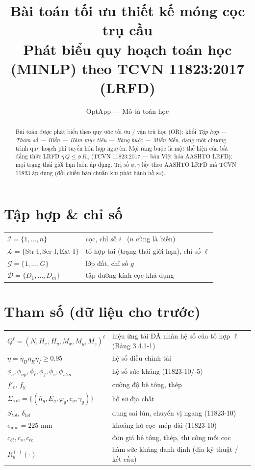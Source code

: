 \documentclass[11pt,a4paper]{article}
\title{\textbf{Bài toán tối ưu thiết kế móng cọc trụ cầu}\\[3pt]
\large Phát biểu quy hoạch toán học (MINLP) theo TCVN 11823:2017 (LRFD)}
\author{OptApp --- Mô tả toán học}
\date{}
\newcommand{\Dset}{\mathcal{D}}
\newcommand{\Lset}{\mathcal{L}}
\newcommand{\Iset}{\mathcal{I}}
\begin{document}
\maketitle

\begin{abstract}\noindent
Bài toán được phát biểu theo quy ước tối ưu / vận trù học (OR): khối \emph{Tập hợp ---
Tham số --- Biến --- Hàm mục tiêu --- Ràng buộc --- Miền biến}, dạng một chương trình
quy hoạch phi tuyến hỗn hợp nguyên. Mọi ràng buộc là một thể hiện của bất đẳng thức
LRFD $\eta\,Q \le \phi\,R_n$ (TCVN 11823:2017 --- bản Việt hóa AASHTO LRFD); mọi trạng
thái giới hạn luôn áp dụng. Trị số $\phi,\gamma$ lấy theo AASHTO LRFD mà TCVN 11823 áp
dụng (đối chiếu bản chuẩn khi phát hành hồ sơ).
\end{abstract}

\section{Tập hợp \& chỉ số}
\begin{tabular}{@{}ll@{}}
\toprule
$\Iset=\{1,\dots,n\}$ & cọc, chỉ số $i$ \ ($n$ cũng là biến) \\
$\Lset=\{\text{Str-I},\text{Ser-I},\text{Ext-I}\}$ & tổ hợp tải (trạng thái giới hạn), chỉ số $\ell$ \\
$\mathcal{G}=\{1,\dots,G\}$ & lớp đất, chỉ số $g$ \\
$\Dset=\{D_1,\dots,D_m\}$ & tập đường kính cọc khả dụng \\
\bottomrule
\end{tabular}

\section{Tham số (dữ liệu cho trước)}
\begin{tabular}{@{}ll@{}}
\toprule
$Q^\ell=(N,H_x,H_y,M_x,M_y,M_z)^\ell$ & hiệu ứng tải ĐÃ nhân hệ số của tổ hợp $\ell$ (Bảng 3.4.1-1) \\
$\eta=\eta_D\eta_R\eta_I\ge0.95$ & hệ số điều chỉnh tải \\
$\phi_c,\phi_{up},\phi_\ell,\phi_f,\phi_v,\phi_{stm}$ & hệ số sức kháng (11823-10/-5) \\
$f'_c,\,f_y$ & cường độ bê tông, thép \\
$\Sigma_{\text{soil}}=\{(h_g,E_g,\varphi_g,c_g,\gamma_g)\}$ & hồ sơ địa chất \\
$S_{tol},\,\delta_{tol}$ & dung sai lún, chuyển vị ngang (11823-10) \\
$e_{\min}=225$ mm & khoảng hở cọc--mép đài (11823-10) \\
$c_{bt},c_s,c_{tc}$ & đơn giá bê tông, thép, thi công mỗi cọc \\
$R_n^{(\cdot)}(\cdot)$ & hàm sức kháng danh định (địa kỹ thuật / kết cấu) \\
\bottomrule
\end{tabular}
\end{document}
